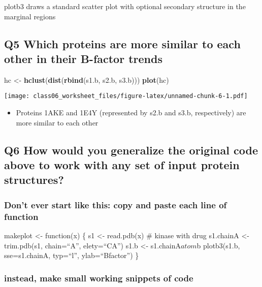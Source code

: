\documentclass[]{article}
\newenvironment{Shaded}{\begin{snugshade}}{\end{snugshade}}
\newcommand{\KeywordTok}[1]{\textcolor[rgb]{0.13,0.29,0.53}{\textbf{#1}}}
\newcommand{\StringTok}[1]{\textcolor[rgb]{0.31,0.60,0.02}{#1}}
\newcommand{\NormalTok}[1]{#1}
\providecommand{\tightlist}{%
  \setlength{\itemsep}{0pt}\setlength{\parskip}{0pt}}
\begin{document}
plotb3 draws a standard scatter plot with optional secondary structure
in the marginal regions

\subsection{Q5 Which proteins are more similar to each other in their
B-factor
trends}\label{q5-which-proteins-are-more-similar-to-each-other-in-their-b-factor-trends}

\begin{Shaded}
\begin{Highlighting}[]
\NormalTok{hc <-}\StringTok{ }\KeywordTok{hclust}\NormalTok{(}\KeywordTok{dist}\NormalTok{(}\KeywordTok{rbind}\NormalTok{(s1.b, s2.b, s3.b)))}
\KeywordTok{plot}\NormalTok{(hc)}
\end{Highlighting}
\end{Shaded}

\texttt{[image: class06\_worksheet\_files/figure-latex/unnamed-chunk-6-1.pdf]}

\begin{itemize}
\tightlist
\item
  Proteins 1AKE and 1E4Y (represented by s2.b and s3.b, respectively)
  are more similar to each other
\end{itemize}

\subsection{Q6 How would you generalize the original code above to work
with any set of input protein
structures?}\label{q6-how-would-you-generalize-the-original-code-above-to-work-with-any-set-of-input-protein-structures}

\subsubsection{Don't ever start like this: copy and paste each line of
function}\label{dont-ever-start-like-this-copy-and-paste-each-line-of-function}

makeplot \textless{}- function(x) \{ s1 \textless{}- read.pdb(x) \#
kinase with drug s1.chainA \textless{}- trim.pdb(s1, chain=``A'',
elety=``CA'') s1.b \textless{}- s1.chainA\(atom\)b plotb3(s1.b,
sse=s1.chainA, typ=``l'', ylab=``Bfactor'') \}

\subsubsection{instead, make small working snippets of
code}\label{instead-make-small-working-snippets-of-code}
\end{document}
